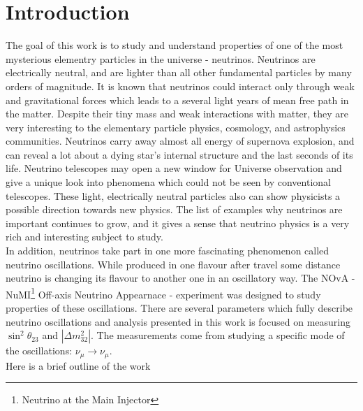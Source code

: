 \chapter{Introduction}
\label{intro_chapter}

The goal of this work is to study and understand properties of one of the most 
mysterious elementry particles in the universe - neutrinos. Neutrinos are electrically
neutral, and are lighter than all other fundamental particles by many orders of magnitude.
It is known that neutrinos could interact only through weak and 
gravitational forces which leads to a several light years of mean free path in 
the matter. Despite their tiny mass and weak interactions
with matter, they are very interesting to the elementary particle physics, cosmology, and
astrophysics communities. Neutrinos carry away almost all energy of supernova 
explosion, and can reveal a lot about a dying star's internal structure and the last 
seconds of its life. Neutrino telescopes may open a new window for Universe observation 
and give a unique look into phenomena which could not be seen by conventional 
telescopes. These light, electrically neutral particles also can show physicists 
a possible direction towards new physics. The list of examples why neutrinos are 
important continues to grow, and it gives a sense that neutrino physics is a 
very rich and interesting subject to study.\\

In addition, neutrinos take part in one more fascinating phenomenon called neutrino
oscillations. While produced in one flavour after travel some distance neutrino is 
changing its flavour to another one in an oscillatory way. The NOvA - 
NuMI\footnote{Neutrino at the Main Injector} Off-axis Neutrino Appearnace - experiment
was designed to study properties of these oscillations. There are several
parameters which fully describe neutrino oscillations and analysis presented in this work 
is focused on measuring $\sin^2\theta_{23}$ and $|\Delta m^2_{32}|$. The measurements 
come from studying a specific mode of the oscillations: $\nu_\mu \rightarrow \nu_\mu$.\\

Here is a brief outline of the work

